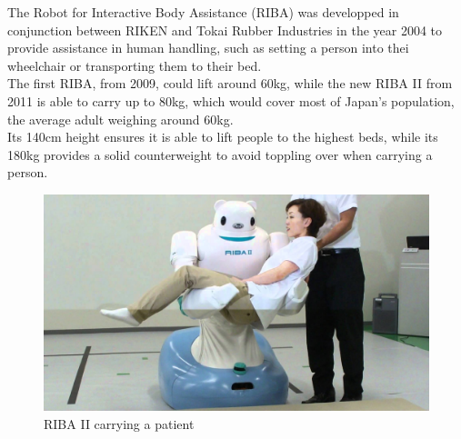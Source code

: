 The Robot for Interactive Body Assistance (RIBA) was developped in conjunction between RIKEN and Tokai Rubber Industries in the year 2004 to provide assistance in human handling, such as setting a person into thei wheelchair or transporting them to their bed.\\

The first RIBA, from 2009, could lift around 60kg, while the new RIBA II from 2011 is able to carry up to 80kg, which would cover most of Japan's population, the average adult weighing around 60kg.\\

Its 140cm height ensures it is able to lift people to the highest beds, while its 180kg provides a solid counterweight to avoid toppling over when carrying a person.\\

	\begin{figure}[H]
			\centering
			\includegraphics[scale=0.2]{images/StateOfArt/riba.jpg}
			\caption{RIBA II carrying a patient}
			\label{riba}
	\end{figure}
	\bigskip